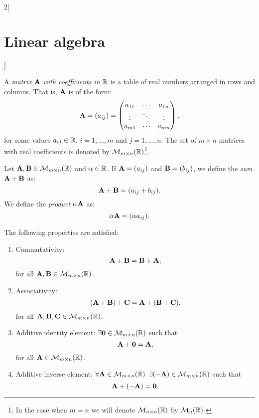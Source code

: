 \documentclass[../../../main.tex]{subfiles}
\begin{document}
\begin{multicols}{2}[\section{Linear algebra}]
\begin{definition}[Matrix]
    A \textit{matrix $\vb{A}$ with coefficients in $\mathbb{R}$} is a table of real numbers arranged in rows and columns. That is, $\vb{A}$ is of the form: 
    \begin{equation*}
        \vb{A}=(a_{ij})=
        \begin{pmatrix}
            a_{11} & \cdots & a_{1n} \\
            \vdots & \ddots & \vdots \\
            a_{m1} & \cdots & a_{mn} 
        \end{pmatrix},
    \end{equation*}
    for some values $a_{ij}\in\mathbb{R}$, $i=1,\ldots,m$ and $j=1,\ldots,n$. The set of $m\times n$ matrices with real coefficients is denoted by $\mathcal{M}_{m\times n}(\mathbb{R})$\footnote{In the case when $m=n$ we will denote $\mathcal{M}_{n\times n}(\mathbb{R})$ by $\mathcal{M}_n(\mathbb{R})$.}.
\end{definition}
\begin{definition}
    Let $\vb{A},\vb{B}\in\mathcal{M}_{m\times n}(\mathbb{R})$ and $\alpha\in\mathbb{R}$. If $\vb{A}=(a_{ij})$ and $\vb{B}=(b_{ij})$, we define the \textit{sum $\vb{A}+\vb{B}$} as: $$\vb{A}+\vb{B}=(a_{ij}+b_{ij}).$$
    We define the \textit{product $\alpha\vb{A}$} as: $$\alpha\vb{A}=(\alpha a_{ij}).$$
\end{definition}
\begin{prop}
    The following properties are satisfied:
    \begin{enumerate}
        \item Commutativity: $$\vb{A}+\vb{B}=\vb{B}+\vb{A},$$ for all $\vb{A},\vb{B}\in\mathcal{M}_{m\times n}(\mathbb{R})$.
        \item Associativity: $$(\vb{A}+\vb{B})+\vb{C}=\vb{A}+(\vb{B}+\vb{C}),$$ for all $\vb{A},\vb{B},\vb{C}\in\mathcal{M}_{m\times n}(\mathbb{R})$.
        \item Additive identity element: $\exists\vb{0}\in\mathcal{M}_{m\times n}(\mathbb{R})$ such that $$\vb{A}+\vb{0}=\vb{A},$$ for all $\vb{A}\in\mathcal{M}_{m\times n}(\mathbb{R})$.
        \item Additive inverse element: $\forall\vb{A}\in\mathcal{M}_{m\times n}(\mathbb{R})$ $\exists(-\vb{A})\in\mathcal{M}_{m\times n}(\mathbb{R})$ such that $$\vb{A}+(-\vb{A})=\vb{0}.$$

\end{enumerate}
\end{prop}
\end{multicols}
\end{document}
